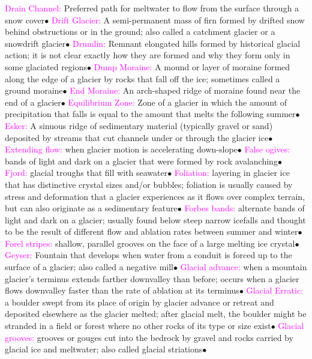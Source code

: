 \documentclass{article}
\newcommand{\ddd}{$\bullet$}
\newcommand{\pink}[1]{\textcolor{magenta}{#1}}
\newcommand{\vocab}[1]{{\pink{#1}}}
\begin{document}
\begin{multicols*}{4}
		\vocab{        Drain Channel: } Preferred path for meltwater to flow from the surface through a snow cover\ddd
		\vocab{        Drift Glacier: } A semi-permanent mass of firn formed by drifted snow behind obstructions or in the ground; also called a catchment glacier or a snowdrift glacier\ddd
		\vocab{        Drumlin: } Remnant elongated hills formed by historical glacial action; it is not clear exactly how they are formed and why they form only in some glaciated regions\ddd
		\vocab{        Dump Moraine: } A mound or layer of moraine formed along the edge of a glacier by rocks that fall off the ice; sometimes called a ground moraine\ddd
		\vocab{        End Moraine: } An arch-shaped ridge of moraine found near the end of a glacier\ddd
		\vocab{        Equilibrium Zone: } Zone of a glacier in which the amount of precipitation that falls is equal to the amount that melts the following summer\ddd
		\vocab{        Esker: } A sinuous ridge of sedimentary material (typically gravel or sand) deposited by streams that cut channels under or through the glacier ice\ddd
		\vocab{        Extending flow: } when glacier motion is accelerating down-slope\ddd
		\vocab{        False ogives: } bands of light and dark on a glacier that were formed by rock avalanching\ddd
		\vocab{        Fjord: } glacial troughs that fill with seawater\ddd
		\vocab{        Foliation: } layering in glacier ice that has distinctive crystal sizes and/or bubbles; foliation is usually caused by stress and deformation that a glacier experiences as it flows over complex terrain, but can also originate as a sedimentary feature\ddd
		\vocab{        Forbes bands: } alternate bands of light and dark on a glacier; usually found below steep narrow icefalls and thought to be the result of different flow and ablation rates between summer and winter\ddd
		\vocab{        Forel stripes: } shallow, parallel grooves on the face of a large melting ice crystal\ddd 
		\vocab{        Geyser: } Fountain that develops when water from a conduit is forced up to the surface of a glacier; also called a negative mill\ddd
		\vocab{        Glacial advance: } when a mountain glacier's terminus extends farther downvalley than before; occurs when a glacier flows downvalley faster than the rate of ablation at its terminus\ddd
		\vocab{        Glacial Erratic: } a boulder swept from its place of origin by glacier advance or retreat and deposited elsewhere as the glacier melted; after glacial melt, the boulder might be stranded in a field or forest where no other rocks of its type or size exist\ddd
		\vocab{        Glacial grooves: } grooves or gouges cut into the bedrock by gravel and rocks carried by glacial ice and meltwater; also called glacial striations\ddd

\end{multicols*}
\end{document}

